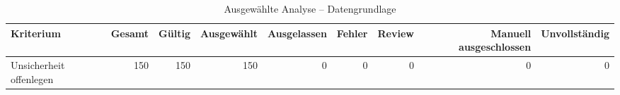 \begin{table}[htbp]
\centering
\caption{Ausgewählte Analyse -- Datengrundlage}
\begin{tabular}{lrrrrrrrr}
\toprule
Kriterium & Gesamt & Gültig & Ausgewählt & Ausgelassen & Fehler & Review & Manuell ausgeschlossen & Unvollständig \\
\midrule
Unsicherheit offenlegen & 150 & 150 & 150 & 0 & 0 & 0 & 0 & 0 \\
\bottomrule
\end{tabular}
\end{table}

